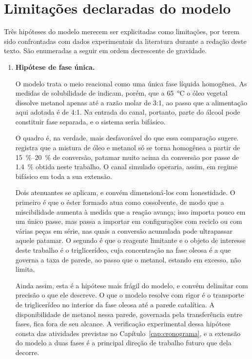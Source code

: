 \section{Limitações declaradas do modelo}
\label{sec:limitacoes}

Três hipóteses do modelo merecem ser explicitadas como limitações, por terem
sido confrontadas com dados experimentais da literatura durante a redação deste
texto. São enumeradas a seguir em ordem decrescente de gravidade.

\begin{enumerate}
\itemsep10pt

\item \textbf{Hipótese de fase única.}

O modelo trata o meio reacional como uma única fase líquida homogênea. As
medidas de solubilidade de \textcite{Firth2014} indicam, porém, que a
\SI{65}{\celsius} o óleo vegetal dissolve metanol apenas até a razão molar de
\num{3}:\num{1}, ao passo que a alimentação aqui adotada é de \num{4}:\num{1}.
Na entrada do canal, portanto, parte do álcool pode constituir fase separada, e
o sistema seria bifásico.

O quadro é, na verdade, mais desfavorável do que essa comparação sugere.
\textcite{Muller2019} registra que a mistura de óleo e metanol só se torna
homogênea a partir de \SIrange{15}{20}{\percent} de conversão, patamar muito
acima da conversão por passe de \SI{1.4}{\percent} obtida neste trabalho. O
canal simulado operaria, assim, em regime bifásico em toda a sua extensão.

Dois atenuantes se aplicam, e convém dimensioná-los com honestidade. O primeiro
é que o éster formado atua como cossolvente, de modo que a miscibilidade aumenta
à medida que a reação avança; isso importa pouco em um único passe, mas passa a
importar em configurações com reciclo ou com várias peças em série, nas quais a
conversão acumulada pode ultrapassar aquele patamar. O segundo é que o reagente
limitante e o objeto de interesse deste trabalho é o triglicerídeo, cuja
concentração na fase oleosa é a que governa a taxa de parede, ao passo que o
metanol, estando em excesso, não limita.

Ainda assim, esta é a hipótese mais frágil do modelo, e convém delimitar com
precisão o que ele descreve. O que o modelo resolve com rigor é o transporte de
triglicerídeo no interior da fase oleosa até a parede catalítica. A
disponibilidade de metanol nessa parede, governada pela transferência entre
fases, fica fora de seu alcance. A verificação experimental dessa hipótese
consta das atividades previstas no Capítulo~\ref{cap:cronograma}, e a extensão
do modelo a duas fases é a principal direção de trabalho futuro que dela
decorre.


\end{enumerate}
